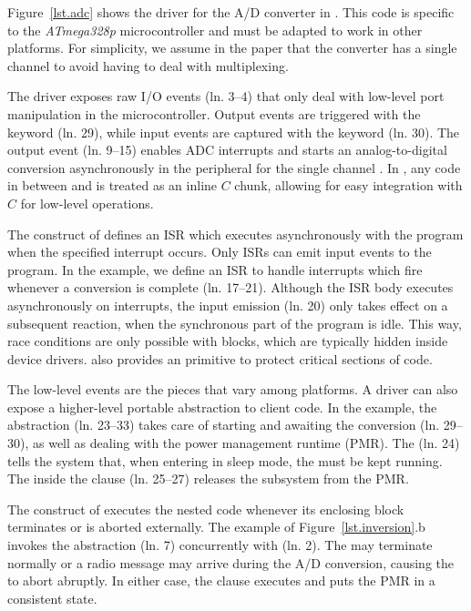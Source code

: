 Figure~\ref{lst.adc} shows the driver for the A/D converter in \CEU.
This code is specific to the \emph{ATmega328p} microcontroller and must be
adapted to work in other platforms.
For simplicity, we assume in the paper that the converter has a single channel
to avoid having to deal with multiplexing.

The driver exposes raw I/O events (ln. 3--4) that only deal with low-level
port manipulation in the microcontroller.
Output events are triggered with the  keyword (ln. 29), while input
events are captured with the  keyword (ln. 30).
%
The output event  (ln. 9--15) enables ADC interrupts and
starts an analog-to-digital conversion asynchronously in the peripheral for
the single channel .
In \CEU, any code in between \code{\{} and \code{\}} is treated as an inline
$C$ chunk, allowing for easy integration with $C$ for low-level operations.

The  construct of \CEU defines an ISR which executes
asynchronously with the program when the specified interrupt occurs.
Only ISRs can emit input events to the program.
In the example, we define an ISR to handle  interrupts which fire
whenever a conversion is complete (ln. 17--21).
%
Although the ISR body executes asynchronously on interrupts, the input emission
(ln. 20) only takes effect on a subsequent reaction, when the synchronous part
of the program is idle.
%
This way, race conditions are only possible with  blocks, which
are typically hidden inside device drivers.
\CEU also provides an  primitive to protect critical sections of
code.

The low-level events are the pieces that vary among platforms.
A driver can also expose a higher-level portable abstraction to client code.
%
In the example, the  abstraction (ln. 23--33) takes care of
starting and awaiting the conversion (ln. 29--30), as well as dealing with the
power management runtime (PMR).
%
The  (ln. 24) tells the system that, when entering in
sleep mode, the  must be kept running.
%
The  inside the  clause (ln. 25--27)
releases the  subsystem from the PMR.

The  construct of \CEU executes the nested code whenever its
enclosing block terminates or is aborted externally.
%
The example of Figure~\ref{lst.inversion}.b invokes the 
abstraction (ln. 7) concurrently with  (ln. 2).
%
The  may terminate normally or a radio message may arrive
during the A/D conversion, causing the  to abort abruptly.
In either case, the  clause executes and puts the PMR in a
consistent state.

